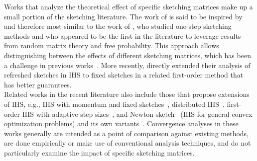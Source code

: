 Works that analyze the theoretical effect of specific sketching matrices make up a small portion of the sketching literature. The work of \citet{Lacotte:2020} is said to be inspired by and therefore most similar to the work of \citet{Dobriban:2019}, who studied one-step sketching methods and who appeared to be the first in the literature to leverage results from random matrix theory and free probability. This approach allows distinguishing between the effects of different sketching matrices, which has been a challenge in previous works~\citep{Choromanski:2017,Pilanci:2016,Raskutti:2016}. More recently, \citet{Lacotte:2020b} directly extended their analysis of refreshed sketches in IHS to fixed sketches in a related first-order method that has better guarantees.
\\

Related works in the recent literature also include those that propose extensions of IHS, e.g., IHS with momentum and fixed sketches~\citep{Ozaslan:2019}, distributed IHS~\citep{Derezinski:2020}, first-order IHS with adaptive step sizes~\citep{Zhang:2020}, and Newton sketch~\citep{Pilanci:2017} (IHS for general convex optimization problems) and its own variants~\citep[e.g.,][]{Derezinski:2021,Lacotte:2021}. Convergence analyses in these works generally are intended as a point of comparison against existing methods, are done empirically or make use of conventional analysis techniques, and do not particularly examine the impact of specific sketching matrices.